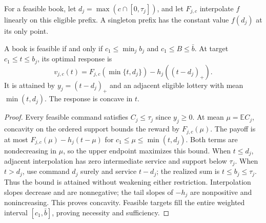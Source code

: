 For a feasible book, let $d_j=\max(c\cap[0,\tau_j])$, and let $F_{j,c}$ interpolate $f$ linearly on this eligible prefix. A singleton prefix has the constant value $f(d_j)$ at its only point.
\begin{proposition}\label{prop:canonical52}
A book is feasible if and only if $c_1\leq\min_jb_j$ and $c_1\leq B\leq\bar b$. At target $c_1\leq t\leq b_j$, its optimal response is
\begin{equation}\label{eq:canonical52}
 v_{j,c}(t)=F_{j,c}(\min\{t,d_j\})-h_j((t-d_j)_+).
\end{equation}
It is attained by $y_j=(t-d_j)_+$ and an adjacent eligible lottery with mean $\min(t,d_j)$. The response is concave in $t$.
\end{proposition}
\begin{proof}
Every feasible command satisfies $C_j\leq\tau_j$ since $y_j\geq0$. At mean $\mu=\mathbb E C_j$, concavity on the ordered support bounds the reward by $F_{j,c}(\mu)$. The payoff is at most $F_{j,c}(\mu)-h_j(t-\mu)$ for $c_1\leq\mu\leq\min(t,d_j)$. Both terms are nondecreasing in $\mu$, so the upper endpoint maximizes this bound. When $t\leq d_j$, adjacent interpolation has zero intermediate service and support below $\tau_j$. When $t>d_j$, use command $d_j$ surely and service $t-d_j$; the realized sum is $t\leq b_j\leq\tau_j$. Thus the bound is attained without weakening either restriction. Interpolation slopes decrease and are nonnegative; the tail slopes of $-h_j$ are nonpositive and nonincreasing. This proves concavity. Feasible targets fill the entire weighted interval $[c_1,\bar b]$, proving necessity and sufficiency.
\end{proof}


